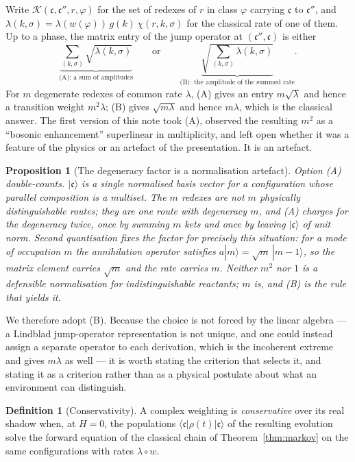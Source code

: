 \documentclass[11pt,a4paper]{article}
\theoremstyle{plain}
\newtheorem{proposition}[theorem]{Proposition}
\theoremstyle{definition}
\newtheorem{definition}[theorem]{Definition}
\theoremstyle{remark}
\newcommand{\wmap}{w}
\newcommand{\gfac}{g}
\begin{document}
Write $\mathcal{K}(\mathfrak{c},\mathfrak{c}'',r,\varphi)$ for the set of redexes of $r$ in class
$\varphi$ carrying $\mathfrak{c}$ to $\mathfrak{c}''$, and
$\lambda(k,\sigma) = \lambda(\wmap(\varphi))\,\gfac(k)\,\chi(r,k,\sigma)$ for the classical rate of
one of them. Up to a phase, the matrix entry of the jump operator at $(\mathfrak{c}'',\mathfrak{c})$
is either
\[
\underbrace{\sum_{(k,\sigma)} \sqrt{\lambda(k,\sigma)}}_{\text{(A): a sum of amplitudes}}
\qquad\text{or}\qquad
\underbrace{\sqrt{\textstyle\sum_{(k,\sigma)} \lambda(k,\sigma)}}_{\text{(B): the amplitude of the summed rate}} .
\]
For $m$ degenerate redexes of common rate $\lambda$, (A) gives an entry $m\sqrt{\lambda}$ and hence a
transition weight $m^2\lambda$; (B) gives $\sqrt{m\lambda}$ and hence $m\lambda$, which is the
classical answer. The first version of this note took (A), observed the resulting $m^2$ as a
``bosonic enhancement'' superlinear in multiplicity, and left open whether it was a feature of the
physics or an artefact of the presentation. It is an artefact.

\begin{proposition}[The degeneracy factor is a normalisation artefact]
\label{prop:bosonic}
Option (A) double-counts. $|\mathfrak{c}\rangle$ is a single \emph{normalised} basis vector for a
configuration whose parallel composition is a multiset. The $m$ redexes are not $m$ physically
distinguishable routes; they are one route with degeneracy $m$, and (A) charges for the degeneracy
twice, once by summing $m$ kets and once by leaving $|\mathfrak{c}\rangle$ of unit norm. Second
quantisation fixes the factor for precisely this situation: for a mode of occupation $m$ the
annihilation operator satisfies $a|m\rangle = \sqrt{m}\,|m-1\rangle$, so the matrix element carries
$\sqrt{m}$ and the rate carries $m$. Neither $m^2$ nor $1$ is a defensible normalisation for
indistinguishable reactants; $m$ is, and (B) is the rule that yields it.
\end{proposition}

We therefore adopt (B). Because the choice is not forced by the linear algebra --- a Lindblad
jump-operator representation is not unique, and one could instead assign a separate operator to each
derivation, which is the incoherent extreme and gives $m\lambda$ as well --- it is worth stating the
criterion that selects it, and stating it as a criterion rather than as a physical postulate about
what an environment can distinguish.

\begin{definition}[Conservativity]
\label{def:conservativity}
A complex weighting is \emph{conservative} over its real shadow when, at $H = 0$, the populations
$\langle\mathfrak{c}|\rho(t)|\mathfrak{c}\rangle$ of the resulting evolution solve the forward
equation of the classical chain of Theorem~\ref{thm:markov} on the same configurations with rates
$\lambda \circ \wmap$.
\end{definition}
\end{document}
